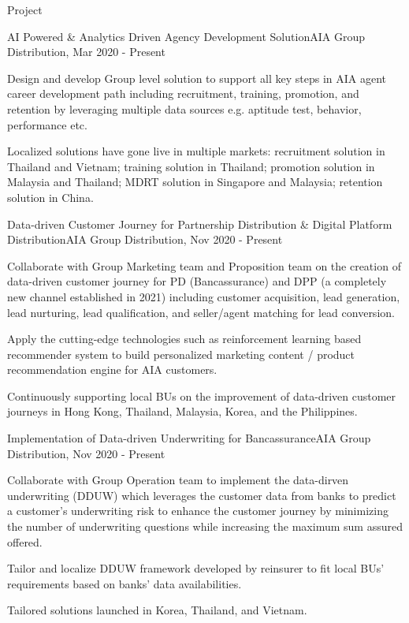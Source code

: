\documentclass{resume} %
\begin{document}
\begin{rSection}{Project}


\begin{rSubsection}{AI Powered \& Analytics Driven Agency Development Solution}{}{AIA Group Distribution, Mar 2020 - Present}{}
\item Design and develop Group level solution to support all key steps in AIA agent career development path including recruitment, training, promotion, and retention by leveraging multiple data sources e.g. aptitude test, behavior, performance etc.
\item Localized solutions have gone live in multiple markets: recruitment solution in Thailand and Vietnam; training solution in Thailand; promotion solution in Malaysia and Thailand; MDRT solution in Singapore and Malaysia; retention solution in China.
\end{rSubsection}


\begin{rSubsection}{Data-driven Customer Journey for Partnership Distribution \& Digital Platform Distribution}{}{AIA Group Distribution, Nov 2020 - Present}{}
\item Collaborate with Group Marketing team and Proposition team on the creation of data-driven customer journey for PD (Bancassurance) and DPP (a completely new channel established in 2021) including customer acquisition, lead generation, lead nurturing, lead qualification, and seller/agent matching for lead conversion.   
\item Apply the cutting-edge technologies such as reinforcement learning based recommender system to build personalized marketing content / product recommendation engine for AIA customers.
\item Continuously supporting local BUs on the improvement of data-driven customer journeys in Hong Kong, Thailand, Malaysia, Korea, and the Philippines. 
\end{rSubsection}


\begin{rSubsection}{Implementation of Data-driven Underwriting for Bancassurance}{}{AIA Group Distribution, Nov 2020 - Present}{}
\item Collaborate with Group Operation team to implement the data-dirven underwriting (DDUW) which leverages the customer data from banks to predict a customer's underwriting risk to enhance the customer journey by minimizing the number of underwriting questions while increasing the maximum sum assured offered.
\item Tailor and localize DDUW framework developed by reinsurer to fit local BUs' requirements based on banks' data availabilities.
\item Tailored solutions launched in Korea, Thailand, and Vietnam.
\end{rSubsection}


\end{rSection}
\end{document}
